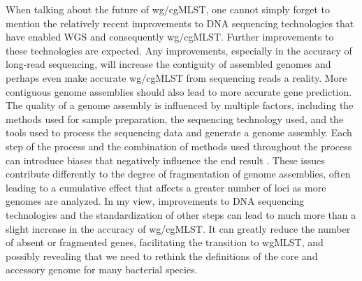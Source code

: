 When talking about the future of \ac{wg/cgMLST}, one cannot simply forget to mention the relatively recent improvements to \ac{DNA} sequencing technologies that have enabled \ac{WGS} and consequently \ac{wg/cgMLST}. Further improvements to these technologies are expected. Any improvements, especially in the accuracy of long-read sequencing, will increase the contiguity of assembled genomes and perhaps even make accurate \ac{wg/cgMLST} from sequencing reads a reality. More contiguous genome assemblies should also lead to more accurate gene prediction. The quality of a genome assembly is influenced by multiple factors, including the methods used for sample preparation, the sequencing technology used, and the tools used to process the sequencing data and generate a genome assembly. Each step of the process and the combination of methods used throughout the process can introduce biases that negatively influence the end result \cite{merda_unraveling_2024}. These issues contribute differently to the degree of fragmentation of genome assemblies, often leading to a cumulative effect that affects a greater number of loci as more genomes are analyzed. In my view, improvements to \ac{DNA} sequencing technologies and the standardization of other steps can lead to much more than a slight increase in the accuracy of \ac{wg/cgMLST}. It can greatly reduce the number of absent or fragmented genes, facilitating the transition to \ac{wgMLST}, and possibly revealing that we need to rethink the definitions of the core and accessory genome for many bacterial species.

